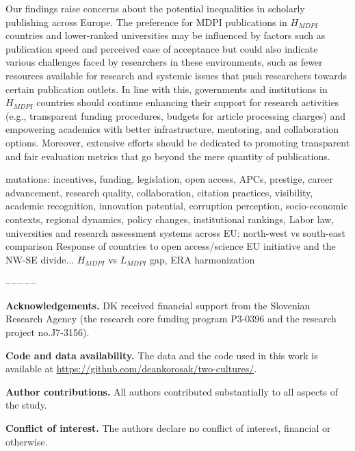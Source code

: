 \documentclass[amsfonts, amssymb, prl, superscriptaddress, notitlepage, twocolumn, nofootinbib]{revtex4-2}
\begin{document}
Our findings raise concerns about the potential inequalities in scholarly publishing across Europe. The preference for MDPI publications in $H_{MDPI}$ countries and lower-ranked universities may be influenced by factors such as publication speed and perceived ease of acceptance but could also indicate various challenges faced by researchers in these environments, such as fewer resources available for research and systemic issues that push researchers towards certain publication outlets. In line with this, governments and institutions in $H_{MDPI}$ countries should continue enhancing their support for research activities (e.g., transparent funding procedures, budgets for article processing charges) and empowering academics with better infrastructure, mentoring, and collaboration options. Moreover, extensive efforts should be dedicated to promoting transparent and fair evaluation metrics that go beyond the mere quantity of publications. 

mutations: incentives, funding, legislation, open access, APCs, prestige, career advancement, research quality, collaboration, citation practices, visibility, academic recognition, innovation potential, corruption perception, socio-economic contexts, regional dynamics, policy changes, institutional rankings,
Labor law, universities and research assessment systems across EU: north-west vs south-east comparison 
Response of countries to open access/science EU initiative and the NW-SE divide... $H_{MDPI}$ vs $L_{MDPI}$ gap, ERA harmonization
  
\begin{center}
--\,--\,--\,--\,--
\end{center}
\vspace{1mm}
\noindent\textbf{Acknowledgements.} DK received financial support from the Slovenian Research Agency (the research core funding program P3-0396 and the research project no.J7-3156). 

\noindent\textbf{Code and data availability.} The data and the code used in this work is available at \url{https://github.com/deankorosak/two-cultures/}.

\noindent\textbf{Author contributions.} All authors contributed substantially to all aspects of the study.

\noindent\textbf{Conflict of interest.} The authors declare no conflict of interest, financial or otherwise.
 

{}

\end{document}
